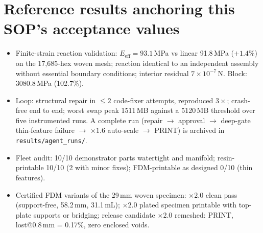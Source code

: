 \documentclass[11pt]{article}
\begin{document}
\section{Reference results anchoring this SOP's acceptance values}\label{app:reference}
\begin{itemize}[nosep]
  \item Finite-strain reaction validation: $E_\mathrm{eff} = 93.1$\,MPa vs linear 91.8\,MPa ($+1.4\%$)
        on the 17{,}685-hex woven mesh; reaction identical to an independent assembly without essential
        boundary conditions; interior residual $7\times10^{-7}$\,N. Block: 3080.8\,MPa (102.7\%).
  \item Loop: structural repair in $\le 2$ code-fixer attempts, reproduced $3\times$; crash-free end to
        end; worst swap peak 1511\,MB against a 5120\,MB threshold over five instrumented runs.
        A complete run (repair $\rightarrow$ approval $\rightarrow$ deep-gate thin-feature failure
        $\rightarrow$ $\times 1.6$ auto-scale $\rightarrow$ PRINT) is archived in
        \texttt{results/agent\_runs/}.
  \item Fleet audit: 10/10 demonstrator parts watertight and manifold; resin-printable 10/10 (2 with
        minor fixes); FDM-printable as designed 0/10 (thin features).
  \item Certified FDM variants of the 29\,mm woven specimen: $\times 2.0$ clean pass (support-free,
        58.2\,mm, 31.1\,mL); $\times 2.0$ plated specimen printable with top-plate supports or bridging;
        release candidate $\times 2.0$ remeshed: PRINT, lost@0.8\,mm = 0.17\%, zero enclosed voids.
\end{itemize}
\end{document}
